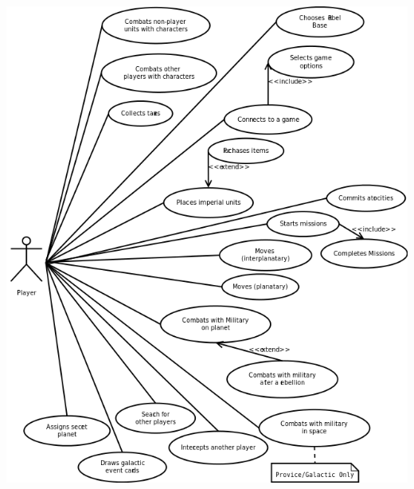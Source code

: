 \documentclass[twoside,letterpaper]{article}
\begin{document}
\vspace{1em}
\includegraphics[scale=0.67]{./images/usecases.png}



\clearpage
\end{document}
